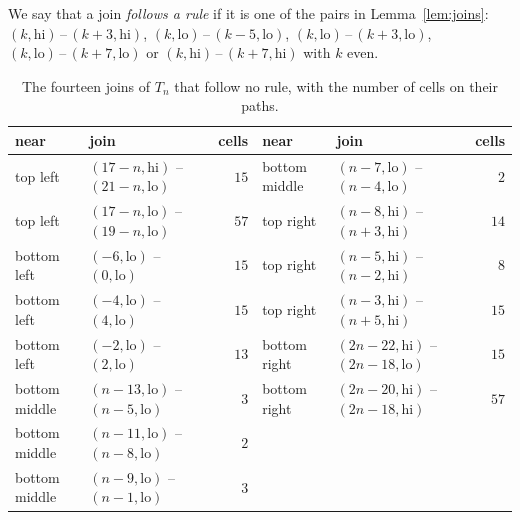 \documentclass[11pt]{amsart}
\theoremstyle{remark}
\newcommand{\lo}{\mathrm{lo}}
\newcommand{\hi}{\mathrm{hi}}
\begin{document}
We say that a join \emph{follows a rule} if it is one of the pairs in Lemma~\ref{lem:joins}:
$(k,\hi)\,\text{--}\,(k+3,\hi)$, $(k,\lo)\,\text{--}\,(k-5,\lo)$, $(k,\lo)\,\text{--}\,(k+3,\lo)$,
$(k,\lo)\,\text{--}\,(k+7,\lo)$ or $(k,\hi)\,\text{--}\,(k+7,\hi)$ with $k$ even.

\begin{table}[t]
\centering
\small\setlength{\tabcolsep}{4pt}
\begin{tabular}{llr@{\quad\ }llr}
near & join & cells & near & join & cells\\ \hline
top left & $(17-n,\hi)$ -- $(21-n,\lo)$ & $15$ & bottom middle & $(n-7,\lo)$ -- $(n-4,\lo)$ & $2$\\
top left & $(17-n,\lo)$ -- $(19-n,\lo)$ & $57$ & top right & $(n-8,\hi)$ -- $(n+3,\hi)$ & $14$\\
bottom left & $(-6,\lo)$ -- $(0,\lo)$ & $15$ & top right & $(n-5,\hi)$ -- $(n-2,\hi)$ & $8$\\
bottom left & $(-4,\lo)$ -- $(4,\lo)$ & $15$ & top right & $(n-3,\hi)$ -- $(n+5,\hi)$ & $15$\\
bottom left & $(-2,\lo)$ -- $(2,\lo)$ & $13$ & bottom right & $(2n-22,\hi)$ -- $(2n-18,\lo)$ & $15$\\
bottom middle & $(n-13,\lo)$ -- $(n-5,\lo)$ & $3$ & bottom right & $(2n-20,\hi)$ -- $(2n-18,\hi)$ & $57$\\
bottom middle & $(n-11,\lo)$ -- $(n-8,\lo)$ & $2$ &&&\\
bottom middle & $(n-9,\lo)$ -- $(n-1,\lo)$ & $3$ &&&
\end{tabular}
\caption{The fourteen joins of $T_n$ that follow no rule, with the number of cells on their paths.}
\label{tab:exc}
\end{table}
\end{document}
